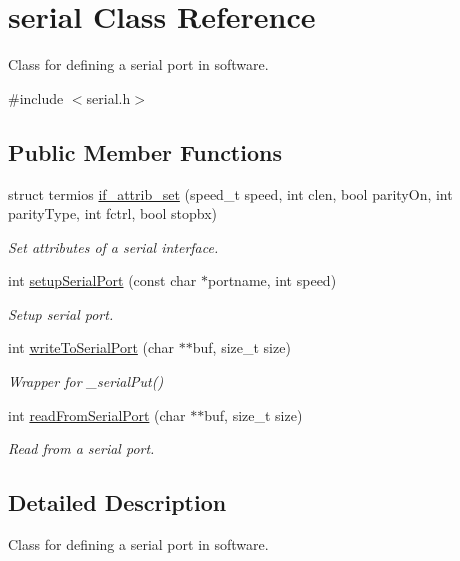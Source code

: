 \hypertarget{classserial}{}\section{serial Class Reference}
\label{classserial}


Class for defining a serial port in software.  




{\ttfamily \#include $<$serial.\+h$>$}

\subsection*{Public Member Functions}
\begin{DoxyCompactItemize}
\item 
struct termios \mbox{\hyperlink{classserial_a51a3e798aa1bb4c2c50a34308b47b4fc}{if\+\_\+attrib\+\_\+set}} (speed\+\_\+t speed, int clen, bool parity\+On, int parity\+Type, int fctrl, bool stopbx)
\begin{DoxyCompactList}\small\item\em Set attributes of a serial interface. \end{DoxyCompactList}\item 
int \mbox{\hyperlink{classserial_a0490dba2c7616a997ca6db6903f6865a}{setup\+Serial\+Port}} (const char $\ast$portname, int speed)
\begin{DoxyCompactList}\small\item\em Setup serial port. \end{DoxyCompactList}\item 
int \mbox{\hyperlink{classserial_af9701c5cbb3402a67291c07d57b3d535}{write\+To\+Serial\+Port}} (char $\ast$$\ast$buf, size\+\_\+t size)
\begin{DoxyCompactList}\small\item\em Wrapper for \+\_\+serial\+Put() \end{DoxyCompactList}\item 
int \mbox{\hyperlink{classserial_a0b1ac3334e65f7cb45379aa764c983bf}{read\+From\+Serial\+Port}} (char $\ast$$\ast$buf, size\+\_\+t size)
\begin{DoxyCompactList}\small\item\em Read from a serial port. \end{DoxyCompactList}\end{DoxyCompactItemize}


\subsection{Detailed Description}
Class for defining a serial port in software. 

